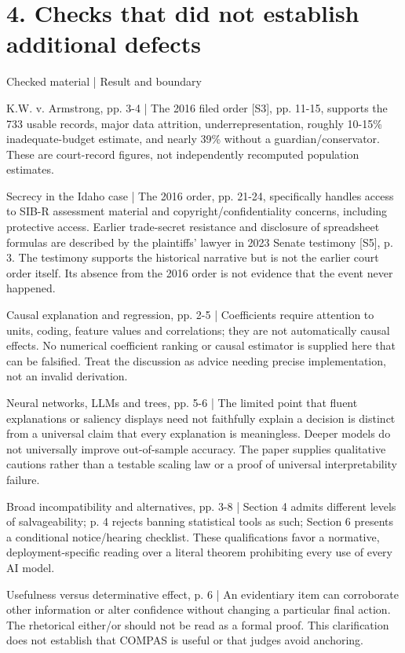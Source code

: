 \documentclass[10pt]{article}
\begin{document}
\section*{4. Checks that did not establish additional defects}
Checked material | Result and boundary\par
K.W. v. Armstrong, pp. 3-4 | The 2016 filed order [S3], pp. 11-15, supports the 733 usable records, major data attrition, underrepresentation, roughly 10-15\% inadequate-budget estimate, and nearly 39\% without a guardian/conservator. These are court-record figures, not independently recomputed population estimates.\par
Secrecy in the Idaho case | The 2016 order, pp. 21-24, specifically handles access to SIB-R assessment material and copyright/confidentiality concerns, including protective access. Earlier trade-secret resistance and disclosure of spreadsheet formulas are described by the plaintiffs’ lawyer in 2023 Senate testimony [S5], p. 3. The testimony supports the historical narrative but is not the earlier court order itself. Its absence from the 2016 order is not evidence that the event never happened.\par
Causal explanation and regression, pp. 2-5 | Coefficients require attention to units, coding, feature values and correlations; they are not automatically causal effects. No numerical coefficient ranking or causal estimator is supplied here that can be falsified. Treat the discussion as advice needing precise implementation, not an invalid derivation.\par
Neural networks, LLMs and trees, pp. 5-6 | The limited point that fluent explanations or saliency displays need not faithfully explain a decision is distinct from a universal claim that every explanation is meaningless. Deeper models do not universally improve out-of-sample accuracy. The paper supplies qualitative cautions rather than a testable scaling law or a proof of universal interpretability failure.\par
Broad incompatibility and alternatives, pp. 3-8 | Section 4 admits different levels of salvageability; p. 4 rejects banning statistical tools as such; Section 6 presents a conditional notice/hearing checklist. These qualifications favor a normative, deployment-specific reading over a literal theorem prohibiting every use of every AI model.\par
Usefulness versus determinative effect, p. 6 | An evidentiary item can corroborate other information or alter confidence without changing a particular final action. The rhetorical either/or should not be read as a formal proof. This clarification does not establish that COMPAS is useful or that judges avoid anchoring.\par
\end{document}
